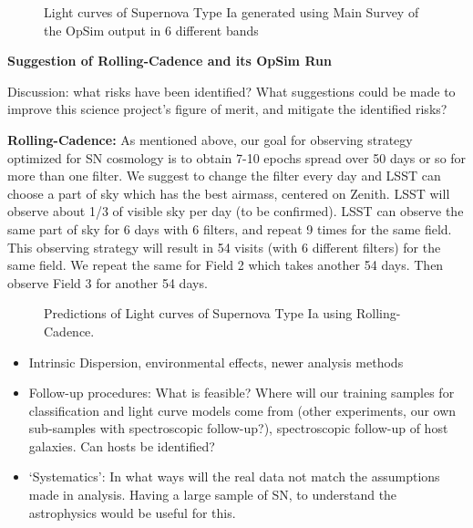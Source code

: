 \begin{figure}[tbh!]
\vskip -1.3in
\vskip -1.3in
\caption{Light curves of Supernova Type Ia generated using Main Survey of the OpSim output in 6 different bands
}
\label{fig:SNIaLCopsimmain}
\end{figure}







{\bf Suggestion of Rolling-Cadence and its OpSim Run}

Discussion: what risks have been identified? What suggestions could be
made to improve this science project's figure of merit, and mitigate
the identified risks?

{\bf Rolling-Cadence:} As mentioned above, our goal for observing strategy optimized for SN cosmology
is to obtain 7-10 epochs spread over 50 days or so for more than one filter. We suggest to change the filter 
every day and LSST can choose a part of sky which has the best airmass, centered on Zenith.
LSST will observe about 1/3 of visible sky per day (to be confirmed). LSST can observe the same part of sky for 6 days 
with 6 filters, and repeat 9 times for the same field. This observing strategy will result in 54 visits (with 6 different filters) for the same field. We repeat the same for Field 2 which takes another 54 days. Then observe Field 3 for another 54 days.

\begin{figure}[tbh!]
\vskip -1.3in
\vskip -1.3in
\caption{Predictions of Light curves of Supernova Type Ia using Rolling-Cadence.
}
\label{fig:SNIaLCopsimmainnew}
\end{figure}



\begin{itemize}
\item Intrinsic Dispersion, environmental effects, newer analysis methods
\item Follow-up procedures: What is feasible? Where will our training samples for classification and light curve models come from (other experiments, our own 
sub-samples with spectroscopic follow-up?), spectroscopic follow-up of host galaxies. Can hosts be identified?
\item `Systematics': In what ways will the real data not match the assumptions made in analysis. Having a large sample of SN, to understand the astrophysics would be useful for this. 
\end{itemize}



\navigationbar
